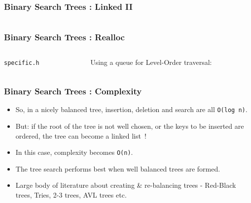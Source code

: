 
\begin{frame}[fragile]
\frametitle{Binary Search Trees : Linked II}
\begin{columns}[T]

\begin{column}{0.45\textwidth}

\end{column}

\begin{column}{0.45\textwidth}

\end{column}

\end{columns}
\end{frame}


\begin{frame}[fragile]
\frametitle{Binary Search Trees : Realloc}
\begin{columns}[T]

\begin{column}{0.45\textwidth}
\verb^specific.h^

\end{column}

\begin{column}{0.45\textwidth}
Using a queue for Level-Order traversal:

\end{column}

\end{columns}
\end{frame}


\begin{frame}[fragile]
\frametitle{Binary Search Trees : Complexity}

\begin{itemize}[<+->]
\item So, in a nicely balanced tree, insertion, deletion and search are all \verb^O(log n)^.
\item  But: if the root of the tree is not well chosen, or the keys to be inserted are ordered, the tree can become a linked list~!
\item In this case,  complexity becomes \verb^O(n)^.	
\item The tree search performs best when well balanced trees are formed.
\item Large body of literature about creating \& re-balancing trees - Red-Black trees, Tries, 2-3 trees, AVL trees etc.
\end{itemize}

\end{frame}

